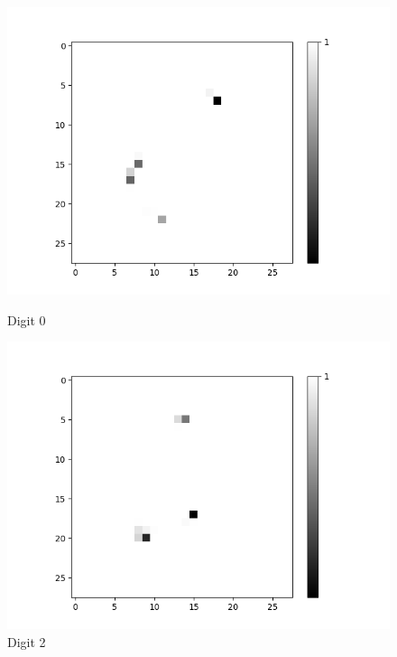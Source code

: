 \begin{figure}[H]
	\captionsetup{labelformat=empty}
	\centering
	\begin{minipage}[b]{0.19\textwidth}
		\includegraphics[width=\textwidth]{AND(NO-LSM)/Positive/Layer0-Neuron-0.png}
		\caption{Digit 0}
		\label{fig:cnf-descrete-generalizatiion}
	\end{minipage}
	\begin{minipage}[b]{0.19\textwidth}
		\includegraphics[width=\textwidth]{AND(NO-LSM)/Positive/Layer0-Neuron-2.png}
		\caption{Digit 2}
		\label{fig:cnf-descrete-generalizatiion}
	\end{minipage}
	\begin{minipage}[b]{0.19\textwidth}

\end{minipage}
\end{figure}

